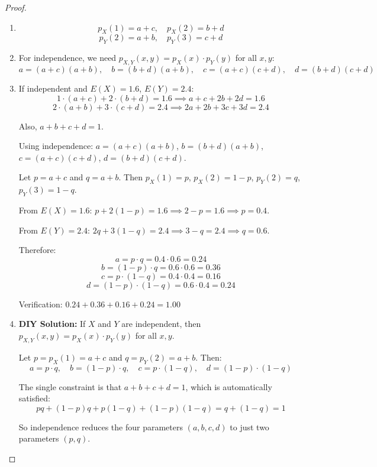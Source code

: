 \begin{proof}
\begin{enumerate}[label=(\alph*)]
    \item 
    \[
    p_X(1) = a + c, \quad p_X(2) = b + d
    \]
    \[
    p_Y(2) = a + b, \quad p_Y(3) = c + d
    \]
    
    \item For independence, we need $p_{X,Y}(x, y) = p_X(x) \cdot p_Y(y)$ for all $x, y$:
    \[
    a = (a+c)(a+b), \quad b = (b+d)(a+b), \quad c = (a+c)(c+d), \quad d = (b+d)(c+d)
    \]
    
    \item If independent and $E(X) = 1.6$, $E(Y) = 2.4$:
    \[
    1 \cdot (a+c) + 2 \cdot (b+d) = 1.6 \implies a + c + 2b + 2d = 1.6
    \]
    \[
    2 \cdot (a+b) + 3 \cdot (c+d) = 2.4 \implies 2a + 2b + 3c + 3d = 2.4
    \]
    
    Also, $a + b + c + d = 1$.
    
    Using independence: $a = (a+c)(a+b)$, $b = (b+d)(a+b)$, $c = (a+c)(c+d)$, $d = (b+d)(c+d)$.
    
    Let $p = a+c$ and $q = a+b$. Then $p_X(1) = p$, $p_X(2) = 1-p$, $p_Y(2) = q$, $p_Y(3) = 1-q$.
    
    From $E(X) = 1.6$: $p + 2(1-p) = 1.6 \implies 2 - p = 1.6 \implies p = 0.4$.
    
    From $E(Y) = 2.4$: $2q + 3(1-q) = 2.4 \implies 3 - q = 2.4 \implies q = 0.6$.
    
    Therefore:
    \[
    a = p \cdot q = 0.4 \cdot 0.6 = 0.24
    \]
    \[
    b = (1-p) \cdot q = 0.6 \cdot 0.6 = 0.36
    \]
    \[
    c = p \cdot (1-q) = 0.4 \cdot 0.4 = 0.16
    \]
    \[
    d = (1-p) \cdot (1-q) = 0.6 \cdot 0.4 = 0.24
    \]
    
    Verification: $0.24 + 0.36 + 0.16 + 0.24 = 1.00$
    
    \item \textbf{DIY Solution:} If $X$ and $Y$ are independent, then $p_{X,Y}(x, y) = p_X(x) \cdot p_Y(y)$ for all $x, y$.
    
    Let $p = p_X(1) = a + c$ and $q = p_Y(2) = a + b$. Then:
    \[
    a = p \cdot q, \quad b = (1-p) \cdot q, \quad c = p \cdot (1-q), \quad d = (1-p) \cdot (1-q)
    \]
    
    The single constraint is that $a + b + c + d = 1$, which is automatically satisfied:
    \[
    pq + (1-p)q + p(1-q) + (1-p)(1-q) = q + (1-q) = 1
    \]
    
    So independence reduces the four parameters $(a, b, c, d)$ to just two parameters $(p, q)$.
\end{enumerate}
\end{proof}

